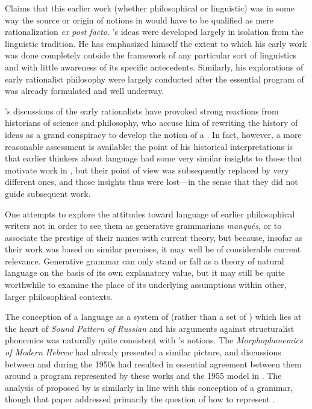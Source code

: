 Claims that this earlier work (whether philosophical or linguistic)
was in some way the source or origin of notions in 
would have to be qualified as mere rationalization \emph{ex post
  facto}. {\Chomsky}'s ideas were developed largely in isolation from the
linguistic tradition. He has emphasized himself \citep[e.g.,
in][]{chomsky79:lg.and.resp} the extent to which his early work was
done completely outside the framework of any particular sort of
linguistics and with little awareness of its specific
antecedents. Similarly, his explorations of early rationalist
philosophy \citep{chomsky66:cartesian} were largely conducted after the essential program of
 was already formulated and well underway.

{\Chomsky}'s discussions of the early rationalists have provoked strong
reactions from historians of science and philosophy, who accuse him of
rewriting the history of ideas as a grand conspiracy to develop the
notion of a . In fact, however, a more reasonable
assessment is available: the point of his historical interpretations
is that earlier thinkers about language had some very similar insights
to those that motivate work in , but their point of
view was subsequently replaced by very different ones, and those
insights thus were lost—in the sense that they did not guide
subsequent work.

One attempts to explore the attitudes toward language of earlier
philosophical writers not in order to see them as generative
grammarians \emph{manqués}, or to associate the prestige of their
names with current theory, but because, insofar as their work was
based on similar premises, it may well be of considerable current
relevance. Generative grammar can only stand or fall as a theory of
natural language on the basis of its own explanatory value, but it may
still be quite worthwhile to examine the place of its underlying
assumptions within other, larger philosophical contexts.

The conception of a language as a system of  (rather than a set
of ) which lies at the heart of 
\textsl{Sound Pattern of Russian} and his arguments against
structuralist phonemics was naturally quite consistent with {\Chomsky}'s
notions. The \textsl{Morphophonemics of Modern Hebrew} had already
presented a similar picture, and discussions between {\Chomsky} and {\Halle}
during the 1950s had resulted in essential agreement between them
around a program represented by these works and the 1955 model in
\citealt{chomsky85:lslt}. The analysis of  proposed by
\citet{chomsky:halle:lukoff} is similarly in line with this conception
of a grammar, though that paper addressed primarily the question of
how to represent .

